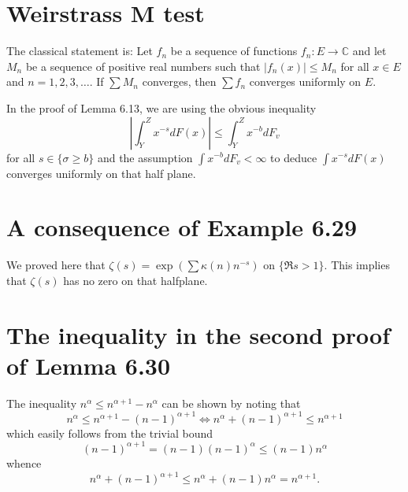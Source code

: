 \documentclass[12pt]{article}
\newcommand{\Abs}[1]{\left| #1 \right|}
\begin{document}
\section{Weirstrass M test}

The classical statement is: Let $f_n$ be a sequence of functions $f_n: E \to \mathbb {C}$ and let $M_n$ be a sequence of positive real numbers such that $|f_n(x)|\leq M_{n}$ for all $x \in E$ and $n = 1, 2, 3, \ldots$. If $\sum M_n$ converges, then $\sum f_n$ converges uniformly on $E$.

In the proof of Lemma 6.13, we are using the obvious inequality
$$\Abs{ \int_Y^Z x^{-s} dF(x) } \leq \int_Y^Z x^{-b} dF_v$$
for all $s \in \{\sigma \geq b\}$ and the assumption $\int x^{-b} dF_v < \infty$ to deduce $\int x^{-s} dF(x)$ converges uniformly on that half plane.

\section{A consequence of Example 6.29}

We proved here that $\zeta(s) = \exp\left(\sum \kappa(n) n^{-s}\right)$ on $\{\Re s > 1\}$. This implies that $\zeta(s)$ has no zero on that halfplane.

\section{The inequality in the second proof of Lemma 6.30}

The inequality $n^\alpha \leq n^{\alpha + 1} - n^{\alpha}$ can be shown by noting that
$$n^\alpha \leq n^{\alpha + 1} - (n - 1)^{\alpha + 1} \iff n^\alpha + (n-1)^{\alpha + 1} \leq n^{\alpha + 1}$$
which easily follows from the trivial bound
$$(n-1)^{\alpha + 1} = (n-1) (n-1)^{\alpha} \leq (n-1) n^{\alpha}$$
whence
$$n^\alpha + (n-1)^{\alpha + 1} \leq n^{\alpha} + (n-1) n^{\alpha} = n^{\alpha + 1}.$$

\unless\ifdefined\IsMainDocument
\end{document}
